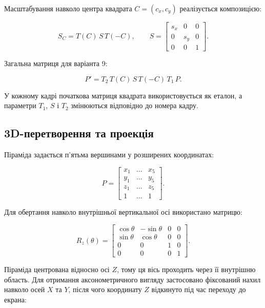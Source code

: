 \documentclass[12pt,a4paper]{article}
\begin{document}
Масштабування навколо центра квадрата \(C=(c_x,c_y)\) реалізується композицією:

\begin{equation}
S_C=T(C)\,S\,T(-C), \qquad
S=\begin{bmatrix}s_x&0&0\\0&s_y&0\\0&0&1\end{bmatrix}.
\end{equation}

Загальна матриця для варіанта 9:

\begin{equation}
P'=T_2\,T(C)\,S\,T(-C)\,T_1\,P.
\end{equation}

У кожному кадрі початкова матриця квадрата використовується як еталон, а параметри \(T_1\), \(S\) і \(T_2\) змінюються відповідно до номера кадру.

\subsection{3D-перетворення та проекція}

Піраміда задається п’ятьма вершинами у розширених координатах:

\begin{equation}
P=\begin{bmatrix}x_1&\dots&x_5\\y_1&\dots&y_5\\z_1&\dots&z_5\\1&\dots&1\end{bmatrix}.
\end{equation}

Для обертання навколо внутрішньої вертикальної осі використано матрицю:

\begin{equation}
R_z(\theta)=\begin{bmatrix}
\cos\theta&-\sin\theta&0&0\\
\sin\theta&\cos\theta&0&0\\
0&0&1&0\\
0&0&0&1
\end{bmatrix}.
\end{equation}

Піраміда центрована відносно осі \(Z\), тому ця вісь проходить через її внутрішню область. Для отримання аксонометричного вигляду застосовано фіксований нахил навколо осей \(X\) та \(Y\), після чого координату \(Z\) відкинуто під час переходу до екрана:
\end{document}
